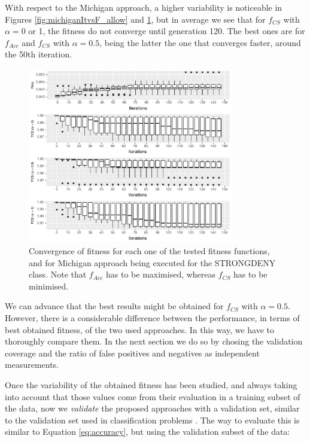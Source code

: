 \documentclass[runningheads]{llncs}
\begin{document}
With respect to the Michigan approach, a higher variability is noticeable in Figures \ref{fig:michiganItvsF_allow} and \ref{fig:michiganItvsF_deny}, but in average we see that for $f_{CS}$ with $\alpha = 0$ or 1, the fitness do not converge until generation 120. The best ones are for $f_{Acc}$ and $f_{CS}$ with $\alpha = 0.5$, being the latter the one that converges faster, around the 50th iteration.

\begin{figure}[h!tb]
	\centering
	\includegraphics[width=0.8\textwidth]{img/michiganItvsF_deny.pdf}
	\caption{Convergence of fitness for each one of the tested fitness functions, and for Michigan approach being executed for the STRONGDENY class. Note that $f_{Acc}$ has to be maximised, whereas $f_{CS}$ has to be minimised.}
	\label{fig:michiganItvsF_deny}
\end{figure}

We can advance that the best results might be obtained for $f_{CS}$
with $\alpha = 0.5$. However, there is a considerable difference between the performance, in terms of best
obtained fitness, of the two used approaches. In this way, we have to thoroughly compare them. In the next section we do so by chosing the validation coverage and the ratio of false positives and negatives as independent measurements. 

\label{subsec:approachcomparison}

Once the variability of the obtained fitness has been studied, and
always taking into account that those values come from their
evaluation in a training subset of the data, now we \textit{validate}
the proposed approaches with a validation set, similar to the validation set used in classification problems \cite{witten2005data}. 
 The way to evaluate this is similar to Equation \ref{eq:accuracy}, but using the validation subset of the data:
\end{document}
